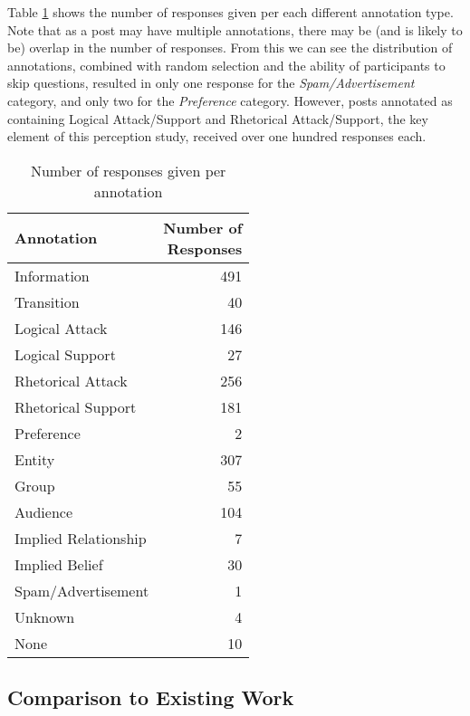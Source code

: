 Table \ref{table:perception:annotation-breakdown} shows the number of responses given per each different annotation type. Note that as a post may have multiple annotations, there may be (and is likely to be) overlap in the number of responses. From this we can see the distribution of annotations, combined with random selection and the ability of participants to skip questions, resulted in only one response for the \textit{Spam/Advertisement} category, and only two for the \textit{Preference} category. However, posts annotated as containing Logical Attack/Support and Rhetorical Attack/Support, the key element of this perception study, received over one hundred responses each.

\begin{table}
\centering
\caption{Number of responses given per annotation}
\label{table:perception:annotation-breakdown}
\begin{tabular}{ l | r }
\textbf{Annotation} & \pbox{2cm}{\textbf{Number of}\\\textbf{Responses}}\\
\hline
Information & 491\\
Transition & 40\\
Logical Attack & 146\\
Logical Support & 27\\
Rhetorical Attack & 256\\
Rhetorical Support & 181\\
Preference & 2\\
Entity & 307\\
Group & 55\\
Audience & 104\\
Implied Relationship & 7\\
Implied Belief & 30\\
Spam/Advertisement & 1\\	
Unknown & 4\\
None & 10\\
\end{tabular}
\end{table}












\subsection{Comparison to Existing Work}

